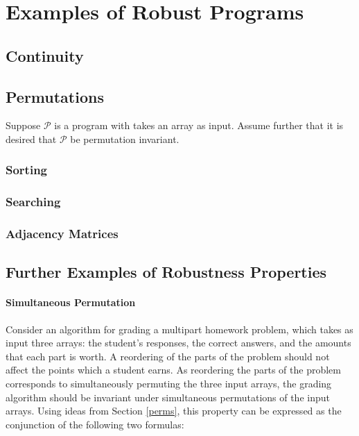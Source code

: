 \documentclass{llncs}
\begin{document}
\section{Examples of Robust Programs}

\subsection{Continuity}


\subsection{Permutations}

Suppose \(\mathcal{P}\) is a program with takes an array as input.  Assume further that it is desired that \(\mathcal{P}\) be permutation invariant.

\subsubsection{Sorting}




\subsubsection{Searching}


\subsubsection{Adjacency Matrices}


\subsection{Further Examples of Robustness Properties}

\paragraph{Simultaneous Permutation}
Consider an algorithm for grading a multipart homework problem, which takes as input three arrays:  the student's responses, the correct answers, and the amounts that each part is worth.  A reordering of the parts of the problem should not affect the points which a student earns.  As reordering the parts of the problem corresponds to simultaneously permuting the three input arrays, the grading algorithm should be invariant under simultaneous permutations of the input arrays.  Using ideas from Section \ref{perms}, this property can be expressed as the conjunction of the following two formulas:
\end{document}
